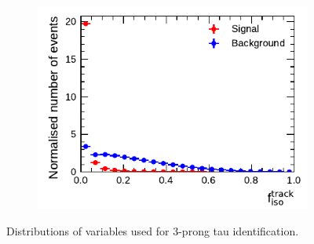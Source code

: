 \begin{figure}[htbp]
\begin{subfigure}{0.5\textwidth}
  \end{subfigure}%
  \begin{subfigure}{0.5\textwidth}
    \centering
    \includegraphics{./figures/baseline_bdt_vars/3p/SumPtTrkFrac.pdf}
  \end{subfigure}%
  \caption[Distributions of variables used for 3-prong tau
  identification]{Distributions of variables used for 3-prong tau
    identification.}
  \label{fig:bdt_vars_3p_overlays}
\end{figure}

